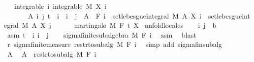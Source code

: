 \begin{isabellebody}
\ \ \ integrable{\isacharcolon}{\kern0pt}\ {\isachardoublequoteopen}{\isasymAnd}i{\isachardot}{\kern0pt}\ integrable\ M\ {\isacharparenleft}{\kern0pt}X\ i{\isacharparenright}{\kern0pt}{\isachardoublequoteclose}\isanewline
\ \ \ \ \ \ \ {\isachardoublequoteopen}{\isasymAnd}A\ i\ j{\isachardot}{\kern0pt}\ t\ {\isasymle}\ i\ {\isasymLongrightarrow}\ i\ {\isasymle}\ j\ {\isasymLongrightarrow}\ A\ {\isasymin}\ F\ i\ {\isasymLongrightarrow}\ set{\isacharunderscore}{\kern0pt}lebesgue{\isacharunderscore}{\kern0pt}integral\ M\ A\ {\isacharparenleft}{\kern0pt}X\ i{\isacharparenright}{\kern0pt}\ {\isacharequal}{\kern0pt}\ set{\isacharunderscore}{\kern0pt}lebesgue{\isacharunderscore}{\kern0pt}integral\ M\ A\ {\isacharparenleft}{\kern0pt}X\ j{\isacharparenright}{\kern0pt}{\isachardoublequoteclose}\ \isanewline
\ \ \ \ \ {\isachardoublequoteopen}martingale\ M\ F\ t\ X{\isachardoublequoteclose}\isanewline
%
\isadelimproof
%
\endisadelimproof
%
\isatagproof
{}\isamarkupfalse%
\ {\isacharparenleft}{\kern0pt}unfold{\isacharunderscore}{\kern0pt}locales{\isacharparenright}{\kern0pt}\isanewline
\ \ \isamarkupfalse%
\ i\ j\ {\isacharcolon}{\kern0pt}{\isacharcolon}{\kern0pt}\ {\isacharprime}{\kern0pt}b\ \isamarkupfalse%
\ asm{\isacharcolon}{\kern0pt}\ {\isachardoublequoteopen}t\ {\isasymle}\ i{\isachardoublequoteclose}\ {\isachardoublequoteopen}i\ {\isasymle}\ j{\isachardoublequoteclose}\isanewline
\ \ \isamarkupfalse%
\ sigma{\isacharunderscore}{\kern0pt}finite{\isacharunderscore}{\kern0pt}subalgebra\ M\ {\isachardoublequoteopen}F\ i{\isachardoublequoteclose}\ \isamarkupfalse%
\ asm\ \isamarkupfalse%
\ blast\isanewline
\ \ \isamarkupfalse%
\ r{\isacharcolon}{\kern0pt}\ sigma{\isacharunderscore}{\kern0pt}finite{\isacharunderscore}{\kern0pt}measure\ {\isachardoublequoteopen}restr{\isacharunderscore}{\kern0pt}to{\isacharunderscore}{\kern0pt}subalg\ M\ {\isacharparenleft}{\kern0pt}F\ i{\isacharparenright}{\kern0pt}{\isachardoublequoteclose}\ \isamarkupfalse%
\ {\isacharparenleft}{\kern0pt}simp\ add{\isacharcolon}{\kern0pt}\ sigma{\isacharunderscore}{\kern0pt}fin{\isacharunderscore}{\kern0pt}subalg{\isacharparenright}{\kern0pt}\isanewline
\ \ \isacommand{{\isacharbraceleft}{\kern0pt}}\isamarkupfalse%
\isanewline
\ \ \ \ \isamarkupfalse%
\ A\ \isamarkupfalse%
\ {\isachardoublequoteopen}A\ {\isasymin}\ restr{\isacharunderscore}{\kern0pt}to{\isacharunderscore}{\kern0pt}subalg\ M\ {\isacharparenleft}{\kern0pt}F\ i{\isacharparenright}{\kern0pt}{\isachardoublequoteclose}\isanewline

\end{isabellebody}
